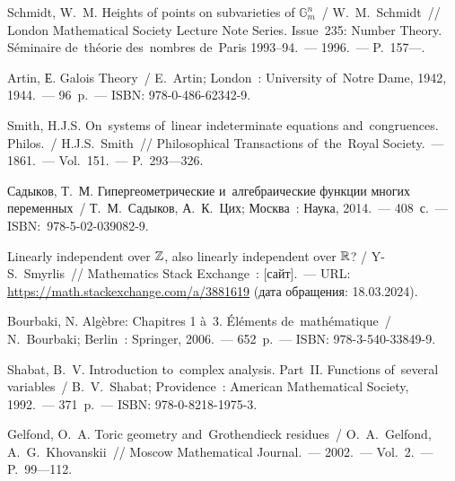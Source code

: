 \documentclass[a4paper,oneside]{article}
\begin{document}




















\pagebreak
{}

\begin{thebibliography}{99}
\setlength\itemindent{12.5mm}

 Schmidt, W.~M. Heights of points on subvarieties of $\mathbb{G}^n_m$~/ W.~M.~{Sch\-midt}~//
London Mathematical Society Lecture Note Series. Issue~235: Number Theory.
Séminaire de~théorie des~nombres de~Paris 1993–94.~— 1996.~— P.~157—.

 Artin, Е. Galois Theory~/ E.~Artin; London~: University of~Notre Dame, 1942, 1944.~— 96~p.~— ISBN: 978-0-486-62342-9.

 Smith, H.J.S. On~systems of~linear indeterminate equations and~{con\-gru\-ences}. Philos.~/ H.J.S.~Smith~//
Philosophical Transactions of~the~Royal Society.~— 1861.~— Vol.~151.~— P.~293—326.

 Садыков, Т.~М. Гипергеометрические и~алгебраические функции многих переменных~/ Т.~М.~Садыков, А.~К.~Цих;
Москва~: Наука, 2014.~— 408~с.~— ISBN: 978-5-02-039082-9.

 Linearly independent over $\mathbb{Z}$, also linearly independent over $\mathbb{R}$? / Y-S.~Smyrlis~//
Mathematics Stack Exchange~: [сайт].~— URL: \url{https://math.stackexchange.com/a/3881619} (дата обращения: 18.03.2024).

 Bourbaki, N. Algèbre: Chapitres 1 à~3. Éléments de~mathématique~/ N.~Bourbaki; Berlin~: Springer, 2006.~— 652~p.~— ISBN: 978-3-540-33849-9.

 Shabat, B.~V. Introduction to~complex analysis. Part~II. Functions of~several variables~/ B.~V.~Shabat; Providence~: American Mathematical Society, 1992.~— 371~p.~— ISBN: 978-0-8218-1975-3.

 Gelfond, O.~A. Toric geometry and~Grothendieck residues~/ O.~A.~{Gel\-fond}, A.~G.~Khovanskii~//
Moscow Mathematical Journal.~— 2002.~— Vol.~2.~— P.~99—112.


\end{thebibliography}
\end{document}
